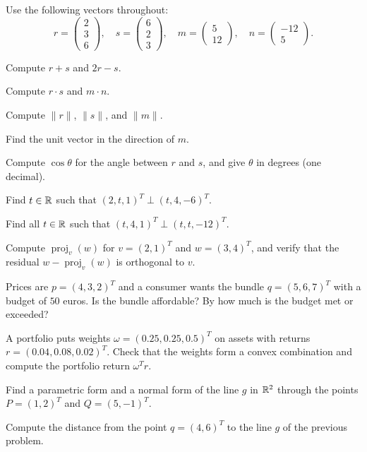 Use the following vectors throughout:
\[
r = \begin{pmatrix} 2 \\ 3 \\ 6 \end{pmatrix}, \quad
s = \begin{pmatrix} 6 \\ 2 \\ 3 \end{pmatrix}, \quad
m = \begin{pmatrix} 5 \\ 12 \end{pmatrix}, \quad
n = \begin{pmatrix} -12 \\ 5 \end{pmatrix}.
\]

\begin{problems}
  \item Compute $r + s$ and $2 r - s$.
  \item Compute $r \cdot s$ and $m \cdot n$.
  \item Compute $\|r\|$, $\|s\|$, and $\|m\|$.
  \item Find the unit vector in the direction of $m$.
  \item Compute $\cos \theta$ for the angle between $r$ and $s$, and give $\theta$ in degrees (one decimal).
  \item Find $t \in \mathbb{R}$ such that $(2, t, 1)^{T} \perp (t, 4, -6)^{T}$.
  \item Find all $t \in \mathbb{R}$ such that $(t, 4, 1)^{T} \perp (t, t, -12)^{T}$.
  \item Compute $\operatorname{proj}_{v}(w)$ for $v = (2, 1)^{T}$ and $w = (3, 4)^{T}$, and verify that the residual $w - \operatorname{proj}_{v}(w)$ is orthogonal to $v$.
  \item Prices are $p = (4, 3, 2)^{T}$ and a consumer wants the bundle $q = (5, 6, 7)^{T}$ with a budget of $50$ euros. Is the bundle affordable? By how much is the budget met or exceeded?
  \item A portfolio puts weights $\omega = (0.25, 0.25, 0.5)^{T}$ on assets with returns $r = (0.04, 0.08, 0.02)^{T}$. Check that the weights form a convex combination and compute the portfolio return $\omega^{T} r$.
  \item Find a parametric form and a normal form of the line $g$ in $\mathbb{R}^{2}$ through the points $P = (1, 2)^{T}$ and $Q = (5, -1)^{T}$.
  \item Compute the distance from the point $q = (4, 6)^{T}$ to the line $g$ of the previous problem.

\end{problems}
